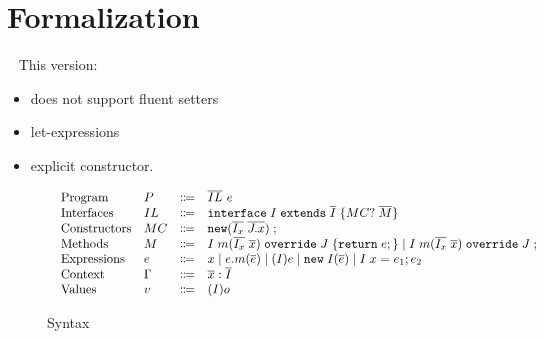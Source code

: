 \section{Formalization}~\label{sec:formalization}
This version:
\begin{itemize}
	\item does not support fluent setters
	\item let-expressions
	\item explicit constructor.
\end{itemize}
\begin{figure*}
	\saveSpaceFig
	\begin{displaymath}
		\begin{array}{l}
			\begin{array}{llrl}
				\text{Program}		& P & \Coloneqq  & \overline{IL} \ e  \\
				\text{Interfaces}   & IL & \Coloneqq & \texttt{interface} \; I \; \texttt{extends} \; \overline{I} \; {\{} MC? \; \overline{M} {\}} \\
				\text{Constructors} & MC & \Coloneqq & \texttt{new} (\overline{I_x} \; \overline{J.x}) \; ; \\
				\text{Methods}      & M  & \Coloneqq & I \; m (\overline{I_x} \; \overline{x}) \; \texttt{override} \; J \; {\{} \texttt{return} \; e ; {\}}  \mid
													   I \; m (\overline{I_x} \; \overline{x}) \; \texttt{override} \; J \; ; \\
				\text{Expressions}  & e  & \Coloneqq & 
				x \mid
				e.m(\overline{e}) \mid
				(I)e \mid 
				\texttt{new} \; I(\overline{e}) \mid 
				I \; x = e_1;e_2 \\
				\text{Context}      & \Gamma & \Coloneqq & \overline{x}:\overline{I} \\
				\text{Values}       & v & \Coloneqq & (I)o \\
			\end{array}
		\end{array}
	\end{displaymath}
	\caption{Syntax}\label{fig:syntax}
	\saveSpaceFig
\end{figure*}

%		
	
